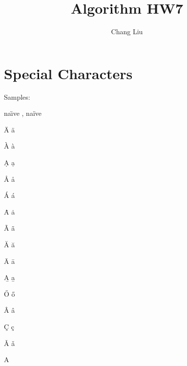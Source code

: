 \documentclass{article}
\author{Chang Liu}
\title{Algorithm HW7}
\begin{document}

\pagestyle{main}

\section{Special Characters}

Samples:

na\"{\i}ve , na\"{i}ve

\"{A}  \"{a} %

\`{A} \`{a}
 
\d{A} \d{a}

\r{A} \r{a}

\'{A} \'{a}

\.{A} \.{a}

\~{A} \~{a}

\u{A} \u{a}

\={A} \={a}

\b{A} \b{a}

\H{O} \H{o}

\^{A} \^{a}

\c{C} \c{c}

\v{A} \v{a}

\textcircled{A}
\end{document}
